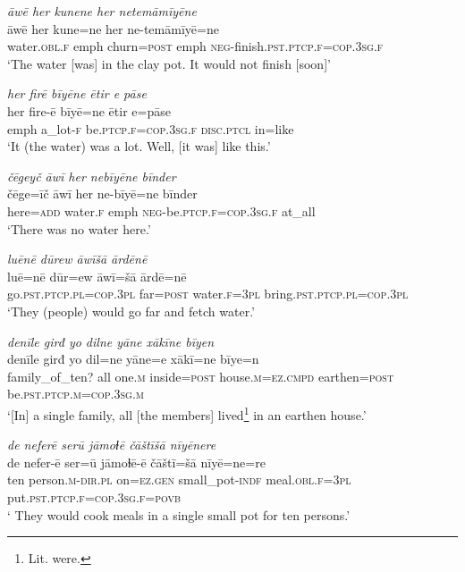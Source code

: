 \ea \label{ŽE.21}
\textit{āwē her kunene her netemāmīyēne} \\ 
\gll āwē her kune=ne her ne-temāmīyē=ne \\ 
 water\textsc{.obl}\textsc{.f} emph churn\textsc{=\textsc{post}} emph \textsc{neg-}finish\textsc{.pst}\textsc{.ptcp}\textsc{.f}\textsc{=cop}\textsc{.3sg}\textsc{.f} \\ 
\glt `The water [was] in the clay pot. It would not finish [soon]'
\z 
 
\ea \label{ŽE.22}
\textit{her firē bīyēne ētir e pāse} \\ 
\gll her fire-ē bīyē=ne ētir e=pāse \\ 
 emph a\_lot\textsc{-f} be\textsc{.ptcp}\textsc{.f}\textsc{=cop}\textsc{.3sg}\textsc{.f} \textsc{disc.ptcl} in=like \\ 
\glt `It (the water) was a lot. Well, [it was] like this.'
\z 
 
\ea \label{ŽE.23}
\textit{čēgeyč āwī her nebīyēne bīnder} \\ 
\gll čēge=īč āwī her ne-bīyē=ne bīnder \\ 
 here\textsc{=add} water\textsc{.f} emph \textsc{neg-}be\textsc{.ptcp}\textsc{.f}\textsc{=cop}\textsc{.3sg}\textsc{.f} at\_all \\ 
\glt `There was no water here.'
\z 
 
\ea \label{ŽE.24}
\textit{luēnē dūrew āwīšā ārdēnē} \\ 
\gll luē=nē dūr=ew āwī=šā ārdē=nē \\ 
 go\textsc{.pst}\textsc{.ptcp}\textsc{.pl}\textsc{=cop}\textsc{.3pl} far\textsc{=\textsc{post}} water\textsc{.f}\textsc{=3pl} bring\textsc{.pst}\textsc{.ptcp}\textsc{.pl}\textsc{=cop}\textsc{.3pl} \\ 
\glt `They (people) would go far and fetch water.'
\z 
 
\ea \label{ŽE.26}
\textit{denīle girđ yo dilne yāne xākīne bīyen} \\ 
\gll denīle girđ yo dil=ne yāne=e xākī=ne bīye=n \\ 
 family\_of\_ten? all one\textsc{.m} inside\textsc{=\textsc{post}} house\textsc{.m}\textsc{=ez}\textsc{.cmpd} earthen\textsc{=\textsc{post}} be\textsc{.pst}\textsc{.ptcp}\textsc{.m}\textsc{=cop}\textsc{.3sg}\textsc{.m} \\ 
\glt `[In] a single family, all [the members] lived\footnote{Lit. were.} in an earthen house.'
\z 
 
\ea \label{ŽE.27}
\textit{de neferē serū jāmoɫē čāštīšā nīyēnere} \\ 
\gll de nefer-ē ser=ū jāmoɫē-ē čāštī=šā nīyē=ne=re \\ 
 ten person\textsc{.m}\textsc{-dir}\textsc{.pl} on\textsc{\textsc{=ez.gen}} small\_pot\textsc{-indf} meal\textsc{.obl}\textsc{.f}\textsc{=3pl} put\textsc{.pst}\textsc{.ptcp}\textsc{.f}\textsc{=cop}\textsc{.3sg}\textsc{.f}\textsc{=\textsc{povb}} \\ 
\glt ` They would cook meals in a single small pot for ten persons.'
\z 
 

